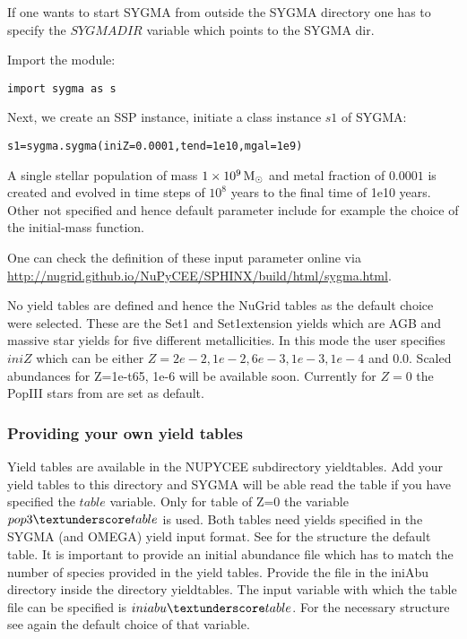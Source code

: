 If one wants to start SYGMA from outside the SYGMA directory
one has to specify the $SYGMADIR$ variable which
points to the SYGMA dir.

Import the module:

\begin{verbatim}
import sygma as s
\end{verbatim}

Next, we create an SSP instance, initiate a class instance $s1$ of SYGMA:


\begin{verbatim}
s1=sygma.sygma(iniZ=0.0001,tend=1e10,mgal=1e9)
\end{verbatim}

A single stellar population of mass $1\times10^{9}\, {\rm M}_\odot$ and metal fraction
of $0.0001$ is created and evolved in time steps of $10^{8}$ years
to the final time of 1e10 years. Other not specified and hence
default parameter include for example the choice of the initial-mass function.


One can check the definition of these input parameter online via
\url{http://nugrid.github.io/NuPyCEE/SPHINX/build/html/sygma.html}.


No yield tables are defined and hence the NuGrid tables as the
default choice were selected. These are the Set1 and Set1extension
yields which are
AGB and massive star yields for five different metallicities.
In this mode the user specifies $iniZ$
which can be either $Z=2e-2, 1e-2, 6e-3, 1e-3, 1e-4$ and $0.0$.
Scaled abundances for Z=1e-t65, 1e-6 will be available soon.
Currently for $Z=0$ the PopIII stars from \cite{heger:10} are set
as default.

\subsubsection{Providing your own yield tables}

Yield tables are available in the NUPYCEE subdirectory 
yield\textunderscore tables. Add your yield tables to
this directory and SYGMA will be able read the table
if you have specified the $table$ variable. Only
for table of Z=0 the variable $pop3\textunderscore table$ is used.
Both tables need yields specified in the SYGMA (and OMEGA)
yield input format. See for the structure the default table.
It is important to provide an initial abundance
file which has to match the number of species provided in the yield tables.
Provide the file in the iniAbu directory inside the directory yield\textunderscore tables.
The input variable with which the table file can be specified is $iniabu\textunderscore table$.
For the necessary structure see again the default choice of that variable.


